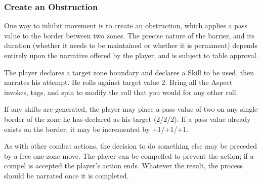 
\subsubsection{Create an Obstruction}

One way to inhibit movement is to create an obstruction, which applies a pass value to the border between two zones. The precise nature of the barrier, and its duration (whether it needs to be maintained or whether it is permanent) depends entirely upon the narrative offered by the player, and is subject to table approval.

The player declares a target zone boundary and declares a Skill to be used, then narrates his attempt. He rolls \dplusskill{} against target value 2. Bring all the Aspect invokes, tags, and spin to modify the roll that you would for any other roll.

If any shifts are generated, the player may place a pass value of two on any single border of the zone he has declared as his target (2/2/2). If a pass value already exists on the border, it may be incremented by +1/+1/+1.

As with other combat actions, the decision to do something else may be preceded by a free one-zone move. The player can be compelled to prevent the action; if a compel is accepted the player's action ends. Whatever the result, the process should be narrated once it is completed.
